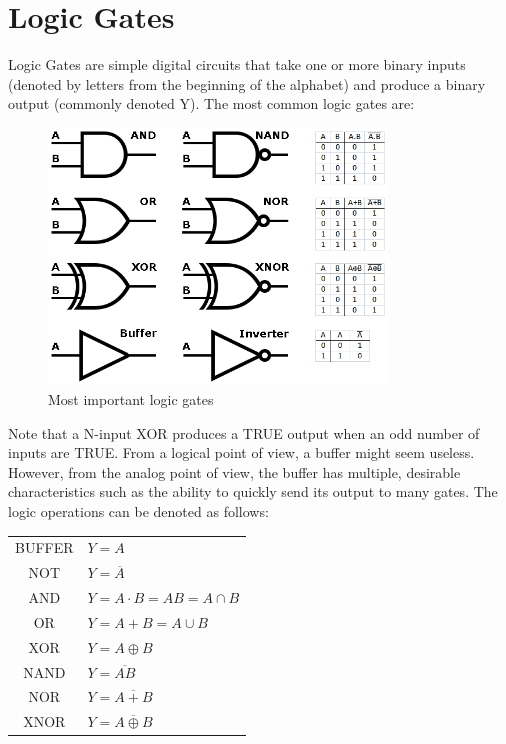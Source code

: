\documentclass[a4paper]{report}
\begin{document}
\section{Logic Gates}

Logic Gates are simple digital circuits that take one or more binary inputs (denoted by letters from the beginning of the alphabet) and 
produce a binary output (commonly denoted Y). The most common logic gates are: \\

\begin{figure}[h]
    \centering
    \includegraphics[width=9cm]{gates.png}
    \caption{Most important logic gates}
\end{figure}

Note that a N-input XOR produces a TRUE output when an odd number of inputs are TRUE. From a logical point of view, a buffer 
might seem useless. However, from the analog point of view, the buffer has multiple, desirable characteristics such as the 
ability to quickly send its output to many gates. The logic operations can be denoted as follows:

\begin{center}
    \begin{tabular}{ c  l }
        BUFFER & $Y = A$  \\ 
        NOT & $Y = \overline{A}$  \\ 
        AND & $Y = A \cdot B = AB = A \cap  B$  \\ 
        OR & $Y = A + B = A \cup B $  \\ 
        XOR & $Y = A \oplus B$  \\ 
        NAND & $Y = \overline{AB}$  \\   
        NOR & $Y = \overline{A + B}$ \\
        XNOR & $Y = \overline{A \oplus B}$
    \end{tabular}
\end{center}
\end{document}
